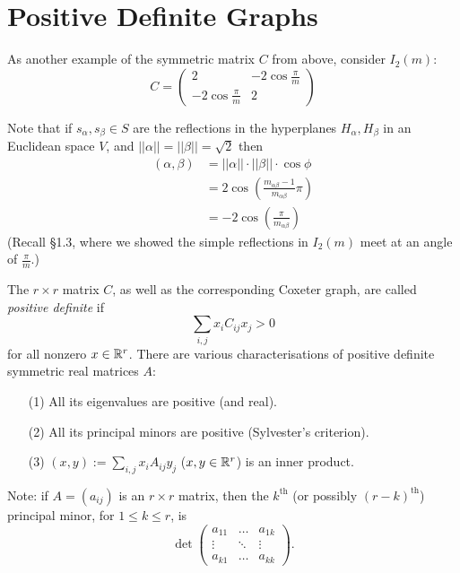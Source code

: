 \section{Positive Definite Graphs}

As another example of the symmetric matrix $C$ from above, consider
$I_2(m)$:
\[
C = \begin{pmatrix}
    2 & -2 \cos \frac{\pi}{m} \\
    -2 \cos \frac{\pi}{m} & 2
\end{pmatrix}
\]

Note that if $s_\alpha, s_\beta \in S$ are the reflections in the hyperplanes
$H_\alpha, H_\beta$ in an Euclidean space $V$, and $||\alpha|| = ||\beta|| =
\sqrt{2}$ then
\begin{align*}
    (\alpha, \beta) &= ||\alpha|| \cdot ||\beta|| \cdot \cos \phi \\
    &= 2 \cos \left( \frac{m_{\alpha \beta}-1}{m_{\alpha \beta}} \pi \right) \\
    &= -2 \cos \left( \frac{\pi}{m_{\alpha \beta}} \right)
\end{align*}
(Recall \S 1.3, where we showed the simple reflections in $I_2(m)$ meet at an
angle of $\frac{\pi}{m}$.)

The $r \times r$ matrix $C$, as well as the corresponding Coxeter graph,
are called {\em positive definite} if
\[
    \sum_{i, j} x_i C_{ij} x_j > 0
\]
for all nonzero $x \in \mathbb{R}^r$. There are various characterisations of positive
definite symmetric real matrices $A$:
\begin{enumerate}
\item[(1)] All its eigenvalues are positive (and real).
\item[(2)] All its principal minors are positive (Sylvester's criterion).
\item[(3)] $(x, y) := \sum_{i,j} x_i A_{ij} y_j$ ($x,y \in \mathbb{R}^r$) is an inner product.
\end{enumerate}

Note: if $A = (a_{ij})$ is an $r \times r$ matrix,
then the $k^{\text{th}}$ (or possibly $(r-k)^{\text{th}}$)
principal minor, for $1 \leq k \leq r$, is
\[
    \det \begin{pmatrix}
        a_{11} & \dots & a_{1k} \\
        \vdots & \ddots & \vdots \\
        a_{k1} & \dots & a_{kk}
    \end{pmatrix}.
\]

